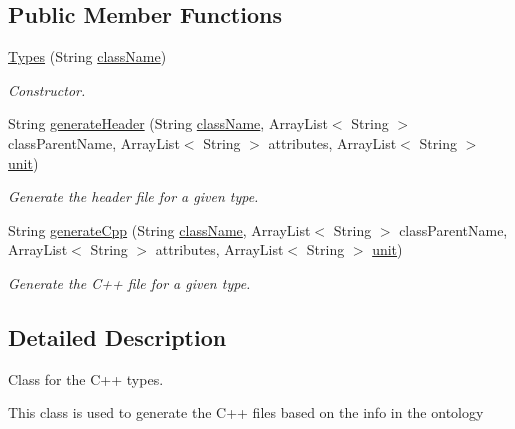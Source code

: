 \subsection*{Public Member Functions}
\begin{DoxyCompactItemize}
\item 
\hyperlink{class_classes_c_p_p_1_1_types_af19f9a134ceb87c04e0ba86548b601c3}{Types} (String \hyperlink{class_classes_c_p_p_1_1_class_generator_afdefd7e06ee9c818e2d3d367bed59bc1}{className})
\begin{DoxyCompactList}\small\item\em Constructor. \end{DoxyCompactList}\item 
String \hyperlink{class_classes_c_p_p_1_1_types_abfdc4a64038a42567aab3a5d97a12ae4}{generateHeader} (String \hyperlink{class_classes_c_p_p_1_1_class_generator_afdefd7e06ee9c818e2d3d367bed59bc1}{className}, ArrayList$<$ String $>$ classParentName, ArrayList$<$ String $>$ attributes, ArrayList$<$ String $>$ \hyperlink{class_classes_c_p_p_1_1_class_generator_ae42121bfdd264575455ea05f08180020}{unit})
\begin{DoxyCompactList}\small\item\em Generate the header file for a given type. \end{DoxyCompactList}\item 
String \hyperlink{class_classes_c_p_p_1_1_types_a6f5cdda584a6edcb4b573d693b8bb5fc}{generateCpp} (String \hyperlink{class_classes_c_p_p_1_1_class_generator_afdefd7e06ee9c818e2d3d367bed59bc1}{className}, ArrayList$<$ String $>$ classParentName, ArrayList$<$ String $>$ attributes, ArrayList$<$ String $>$ \hyperlink{class_classes_c_p_p_1_1_class_generator_ae42121bfdd264575455ea05f08180020}{unit})
\begin{DoxyCompactList}\small\item\em Generate the C++ file for a given type. \end{DoxyCompactList}\end{DoxyCompactItemize}


\subsection{Detailed Description}
Class for the C++ types. 

This class is used to generate the C++ files based on the info in the ontology 

